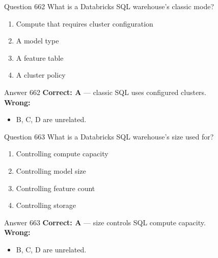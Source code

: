 \documentclass[aspectratio=169,11pt]{beamer}
\begin{document}
	\begin{frame}{Question 662}
		What is a Databricks SQL warehouse's classic mode?
		\begin{enumerate}[label=\Alph*.]
			\item Compute that requires cluster configuration
			\item A model type
			\item A feature table
			\item A cluster policy
		\end{enumerate}
	\end{frame}
	\begin{frame}{Answer 662}
		\textbf{Correct: A} --- classic SQL uses configured clusters.\\
		\vspace{0.5em}
		\textbf{Wrong:}
		\begin{itemize}
			\item B, C, D are unrelated.
		\end{itemize}
	\end{frame}
	
	\begin{frame}{Question 663}
		What is a Databricks SQL warehouse's size used for?
		\begin{enumerate}[label=\Alph*.]
			\item Controlling compute capacity
			\item Controlling model size
			\item Controlling feature count
			\item Controlling storage
		\end{enumerate}
	\end{frame}
	\begin{frame}{Answer 663}
		\textbf{Correct: A} --- size controls SQL compute capacity.\\
		\vspace{0.5em}
		\textbf{Wrong:}
		\begin{itemize}
			\item B, C, D are unrelated.
		\end{itemize}
	\end{frame}
	
\end{document}
